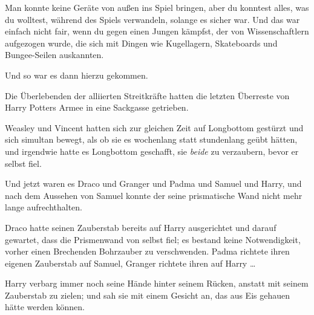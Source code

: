 Man konnte keine Geräte von außen ins Spiel bringen, aber du konntest alles, was du wolltest, während des Spiels verwandeln, solange es sicher war. Und das war einfach nicht fair, wenn du gegen einen Jungen kämpfst, der von Wissenschaftlern aufgezogen wurde, die sich mit Dingen wie Kugellagern, Skateboards und Bungee-Seilen auskannten.

Und so war es dann hierzu gekommen.

Die Überlebenden der alliierten Streitkräfte hatten die letzten Überreste von Harry Potters Armee in eine Sackgasse getrieben.

Weasley und Vincent hatten sich zur gleichen Zeit auf Longbottom gestürzt und sich simultan bewegt, als ob sie es wochenlang statt stundenlang geübt hätten, und irgendwie hatte es Longbottom geschafft, sie \emph{beide} zu verzaubern, bevor er selbst fiel.

Und jetzt waren es Draco und Granger und Padma und Samuel und Harry, und nach dem Aussehen von Samuel konnte der seine prismatische Wand nicht mehr lange aufrechthalten.

Draco hatte seinen Zauberstab bereits auf Harry ausgerichtet und darauf gewartet, dass die Prismenwand von selbst fiel; es bestand keine Notwendigkeit, vorher einen Brechenden Bohrzauber zu verschwenden. Padma richtete ihren eigenen Zauberstab auf Samuel, Granger richtete ihren auf Harry …

Harry verbarg immer noch seine Hände hinter seinem Rücken, anstatt mit seinem Zauberstab zu zielen; und sah sie mit einem Gesicht an, das aus Eis gehauen hätte werden können.

